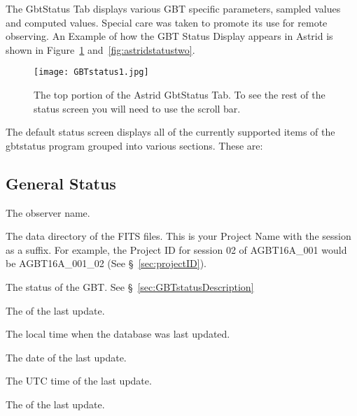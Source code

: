 The GbtStatus Tab displays various \gls{GBT} specific parameters, sampled values and 
computed values. Special care was taken to promote its use for remote 
observing.  An Example of how the \gls{GBT} Status Display appears in \gls{Astrid}
is shown in Figure~\ref{fig:astridstatusone} and~\ref{fig:astridstatustwo}.

\begin{figure}[!h] %
\begin{center}
\texttt{[image: GBTstatus1.jpg]}
\caption[Astrid Status Tab (top)]{The top portion of the \gls{Astrid} GbtStatus Tab.
To see the rest of the status screen you will need to use the scroll bar. 
\label{fig:astridstatusone} }
\end{center}
\end{figure}

The default status screen displays all of the currently supported items of 
the gbtstatus program grouped into various sections.  These are:

\subsection{General Status}
\begin{description}[leftmargin=*,itemsep=0pt]
\item[Observer:] The observer name.
\item[Project ID:] The data directory of the FITS files.  This is your Project Name
with the session as a suffix.  For example, the Project ID for session 02 of AGBT16A\_001
would be AGBT16A\_001\_02 (See \S~\ref{sec:projectID}).
\item[Status:] The status of the \gls{GBT}.  See \S~\ref{sec:GBTstatusDescription}
\item[LST:] The  of the last update.
\item[Last Update:] The local time when the database was last updated.
\item[UTC Date:] The  date of the last update. 
\item[UTC Time:] The \gls{UTC} time of the last update.  
\item[MJD:] The  of the last update.
\end{description}

\newpage

